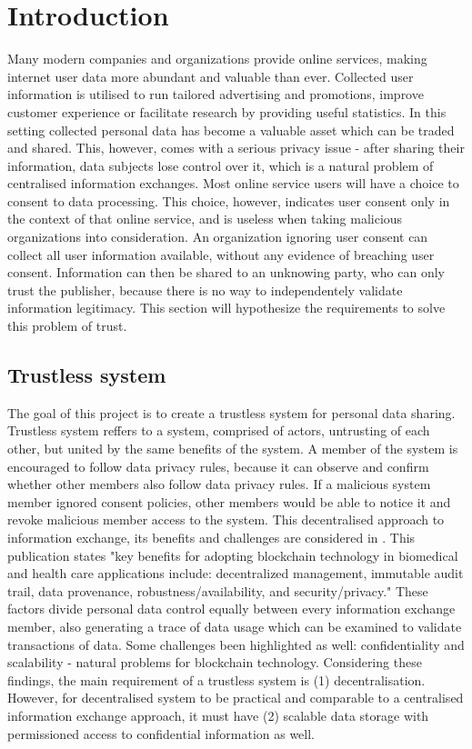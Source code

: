 \documentclass[12pt]{article}
\begin{document}
    \section{Introduction}
    Many modern companies and organizations provide online services, making internet user data more abundant and valuable than ever. Collected user information is utilised to run tailored advertising and promotions, improve customer experience or facilitate research by providing useful statistics. In this setting collected personal data has become a valuable asset which can be traded and shared. This, however, comes with a serious privacy issue - after sharing their information, data subjects lose control over it, which is a natural problem of centralised information exchanges. Most online service users will have a choice to consent to data processing. This choice, however, indicates user consent only in the context of that online service, and is useless when taking malicious organizations into consideration. An organization ignoring user consent can collect all user information available, without any evidence of breaching user consent. Information can then be shared to an unknowing party, who can only trust the publisher, because there is no way to independentely validate information legitimacy. This section will hypothesize the requirements to solve this problem of trust.

    \subsection{Trustless system}
    The goal of this project is to create a trustless system for personal data sharing. Trustless system reffers to a system, comprised of actors, untrusting of each other, but united by the same benefits of the system. A member of the system is encouraged to follow data privacy rules, because it can observe and confirm whether other members also follow data privacy rules. If a malicious system member ignored consent policies, other members would be able to notice it and revoke malicious member access to the system. This decentralised approach to information exchange, its benefits and challenges are considered in \cite{dlt}. This publication states "key benefits for adopting blockchain technology in biomedical and health care applications include: decentralized management, immutable audit trail, data provenance, robustness/availability, and security/privacy."\cite{dlt} These factors divide personal data control equally between every information exchange member, also generating a trace of data usage which can be examined to validate transactions of data. Some challenges been highlighted as well: confidentiality and scalability - natural problems for blockchain technology. Considering these findings, the main requirement of a trustless system is (1) decentralisation. However, for decentralised system to be practical and comparable to a centralised information exchange approach, it must have (2) scalable data storage with permissioned access to confidential information as well.
\end{document}
